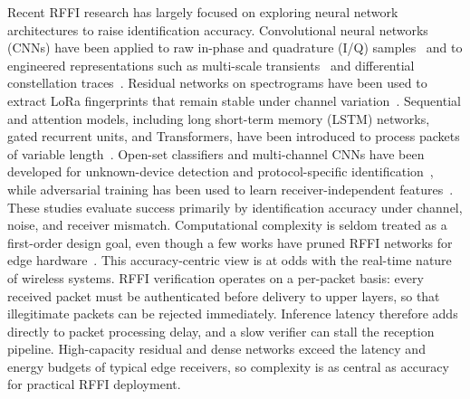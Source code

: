 \documentclass[journal,comsoc]{IEEEtran}
\begin{document}
Recent RFFI research has largely focused on exploring neural network architectures to raise identification accuracy.
Convolutional neural networks (CNNs) have been applied to raw in-phase and quadrature (I/Q) samples~\cite{merchant2018deep,sankhe2020no} and to engineered representations such as multi-scale transients~\cite{yu2019robust} and differential constellation traces~\cite{peng2020deep}.
Residual networks on spectrograms have been used to extract LoRa fingerprints that remain stable under channel variation~\cite{9715147}.
Sequential and attention models, including long short-term memory (LSTM) networks, gated recurrent units, and Transformers, have been introduced to process packets of variable length~\cite{shen2023toward}.
Open-set classifiers and multi-channel CNNs have been developed for unknown-device detection and protocol-specific identification~\cite{hanna2021open,yin2024multichannel}, while adversarial training has been used to learn receiver-independent features~\cite{shen2024towards}.
These studies evaluate success primarily by identification accuracy under channel, noise, and receiver mismatch.
Computational complexity is seldom treated as a first-order design goal, even though a few works have pruned RFFI networks for edge hardware~\cite{jian2022radio}.
This accuracy-centric view is at odds with the real-time nature of wireless systems.
RFFI verification operates on a per-packet basis: every received packet must be authenticated before delivery to upper layers, so that illegitimate packets can be rejected immediately.
Inference latency therefore adds directly to packet processing delay, and a slow verifier can stall the reception pipeline.
High-capacity residual and dense networks exceed the latency and energy budgets of typical edge receivers, so complexity is as central as accuracy for practical RFFI deployment.
\end{document}
